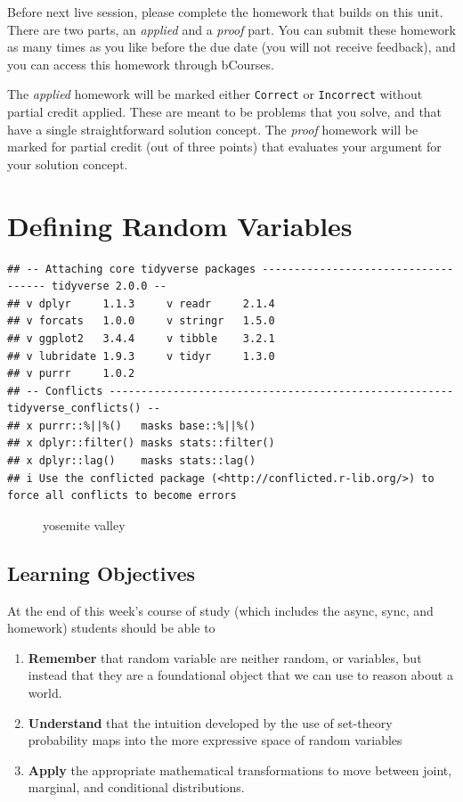 \documentclass[
]{book}
\makeatletter
\newcommand*\pandocbounded[1]{%
  \sbox\pandoc@box{#1}%
  \Gscale@div\@tempa{\textheight}{\dimexpr\ht\pandoc@box+\dp\pandoc@box\relax}%
  \Gscale@div\@tempb{\linewidth}{\wd\pandoc@box}%
  \ifdim\@tempb\p@<\@tempa\p@\let\@tempa\@tempb\fi%
  \ifdim\@tempa\p@<\p@\scalebox{\@tempa}{\usebox\pandoc@box}%
  \else\usebox{\pandoc@box}%
  \fi%
}
\providecommand{\tightlist}{%
  \setlength{\itemsep}{0pt}\setlength{\parskip}{0pt}}
\theoremstyle{definition}
\theoremstyle{definition}
\theoremstyle{definition}
\theoremstyle{definition}
\theoremstyle{remark}
\makeatother
\begin{document}
Before next live session, please complete the homework that builds on this unit. There are two parts, an \emph{applied} and a \emph{proof} part. You can submit these homework as many times as you like before the due date (you will not receive feedback), and you can access this homework through bCourses.

The \emph{applied} homework will be marked either \texttt{Correct} or \texttt{Incorrect} without partial credit applied. These are meant to be problems that you solve, and that have a single straightforward solution concept. The \emph{proof} homework will be marked for partial credit (out of three points) that evaluates your argument for your solution concept.

\chapter{Defining Random Variables}\label{defining-random-variables}

\begin{verbatim}
## -- Attaching core tidyverse packages ------------------------------------ tidyverse 2.0.0 --
## v dplyr     1.1.3     v readr     2.1.4
## v forcats   1.0.0     v stringr   1.5.0
## v ggplot2   3.4.4     v tibble    3.2.1
## v lubridate 1.9.3     v tidyr     1.3.0
## v purrr     1.0.2     
## -- Conflicts ------------------------------------------------------ tidyverse_conflicts() --
## x purrr::%||%()   masks base::%||%()
## x dplyr::filter() masks stats::filter()
## x dplyr::lag()    masks stats::lag()
## i Use the conflicted package (<http://conflicted.r-lib.org/>) to force all conflicts to become errors
\end{verbatim}

\begin{figure}
\centering
\pandocbounded{\texttt{[image: ./images/yosemite.jpg]}}
\caption{yosemite valley}
\end{figure}

\section{Learning Objectives}\label{learning-objectives-1}

At the end of this week's course of study (which includes the async, sync, and homework) students should be able to

\begin{enumerate}
\def\labelenumi{\arabic{enumi}.}
\tightlist
\item
  \textbf{Remember} that random variable are neither random, or variables, but instead that they are a foundational object that we can use to reason about a world.
\item
  \textbf{Understand} that the intuition developed by the use of set-theory probability maps into the more expressive space of random variables
\item
  \textbf{Apply} the appropriate mathematical transformations to move between joint, marginal, and conditional distributions.
\end{enumerate}
\end{document}
